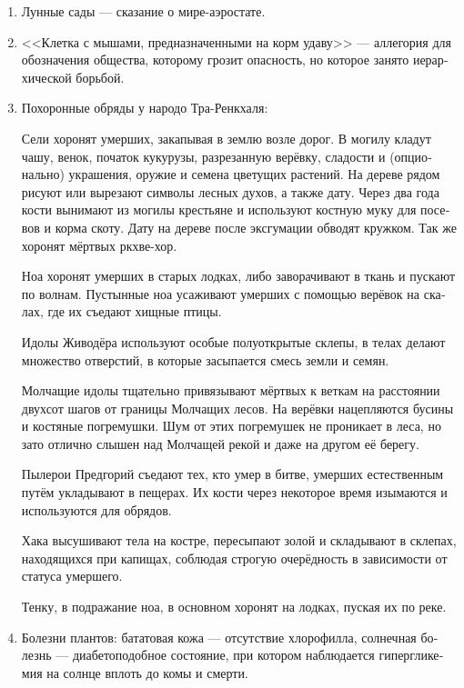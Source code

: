\documentclass[a4paper,12pt,fleqn]{book}\usepackage{polyglossia}\setdefaultlanguage[babelshorthands=true]{russian}\setotherlanguage{english}\defaultfontfeatures{Ligatures=TeX,Mapping=tex-text}\usepackage{xcolor}\newcommand{\ml}[3]{#2}
\begin{document}
{\begin{enumerate}
<<Проблема неживых планет>> --- второй парадокс.
Почему жизнь не зарождается на всех планетах, ведь тогда плотность сознания была бы выше?
Парадокс был решён после разработки шкалы Яо.

\item Лунные сады --- сказание о мире-аэростате.

\item <<Клетка с мышами, предназначенными на корм удаву>> --- аллегория для обозначения общества, которому грозит опасность, но которое занято иерархической борьбой.

\item Похоронные обряды у народо Тра-Ренкхаля:

Сели хоронят умерших, закапывая в землю возле дорог.
В могилу кладут чашу, венок, початок кукурузы, разрезанную верёвку, сладости и (опционально) украшения, оружие и семена цветущих растений.
На дереве рядом рисуют или вырезают символы лесных духов, а также дату.
Через два года кости вынимают из могилы крестьяне и используют костную муку для посевов и корма скоту.
Дату на дереве после эксгумации обводят кружком.
Так же хоронят мёртвых ркхве-хор.

Ноа хоронят умерших в старых лодках, либо заворачивают в ткань и пускают по волнам.
Пустынные ноа усаживают умерших с помощью верёвок на скалах, где их съедают хищные птицы.

Идолы Живодёра используют особые полуоткрытые склепы, в телах делают множество отверстий, в которые засыпается смесь земли и семян.

Молчащие идолы тщательно привязывают мёртвых к веткам на расстоянии двухсот шагов от границы Молчащих лесов.
На верёвки нацепляются бусины и костяные погремушки.
Шум от этих погремушек не проникает в леса, но зато отлично слышен над Молчащей рекой и даже на другом её берегу.

Пылерои Предгорий съедают тех, кто умер в битве, умерших естественным путём укладывают в пещерах.
Их кости через некоторое время изымаются и используются для обрядов.

Хака высушивают тела на костре, пересыпают золой и складывают в склепах, находящихся при капищах, соблюдая строгую очерёдность в зависимости от статуса умершего.

Тенку, в подражание ноа, в основном хоронят на лодках, пуская их по реке.

\item Болезни плантов: бататовая кожа --- отсутствие хлорофилла, солнечная болезнь --- диабетоподобное состояние, при котором наблюдается гипергликемия на солнце вплоть до комы и смерти.


\end{enumerate}}
\end{document}
